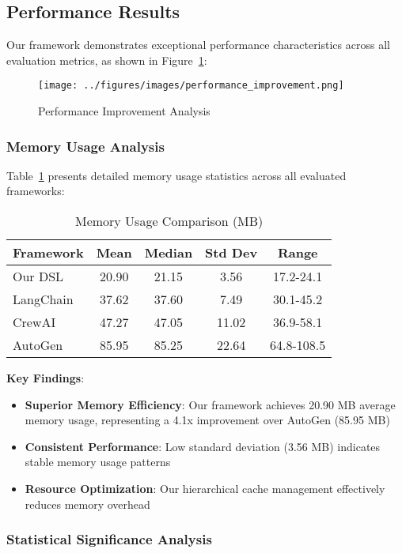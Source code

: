 \documentclass[conference]{IEEEtran}
\begin{document}
\subsection{Performance Results}

Our framework demonstrates exceptional performance characteristics across all evaluation metrics, as shown in Figure~\ref{fig:performance}:

\begin{figure}[htbp]
\centering
\texttt{[image: ../figures/images/performance\_improvement.png]}
\caption{Performance Improvement Analysis}
\label{fig:performance}
\end{figure}

\subsubsection{Memory Usage Analysis}

Table~\ref{tab:memory1} presents detailed memory usage statistics across all evaluated frameworks:

\begin{table}[htbp]
\caption{Memory Usage Comparison (MB)}
\label{tab:memory1}
\centering
\begin{tabular}{@{}lcccc@{}}
\toprule
Framework & Mean & Median & Std Dev & Range \\
\midrule
Our DSL & 20.90 & 21.15 & 3.56 & 17.2-24.1 \\
LangChain & 37.62 & 37.60 & 7.49 & 30.1-45.2 \\
CrewAI & 47.27 & 47.05 & 11.02 & 36.9-58.1 \\
AutoGen & 85.95 & 85.25 & 22.64 & 64.8-108.5 \\
\bottomrule
\end{tabular}
\end{table}

\textbf{Key Findings}:
\begin{itemize}
\item \textbf{Superior Memory Efficiency}: Our framework achieves 20.90 MB average memory usage, representing a 4.1x improvement over AutoGen (85.95 MB)
\item \textbf{Consistent Performance}: Low standard deviation (3.56 MB) indicates stable memory usage patterns
\item \textbf{Resource Optimization}: Our hierarchical cache management effectively reduces memory overhead
\end{itemize}

\subsubsection{Statistical Significance Analysis}
\end{document}
